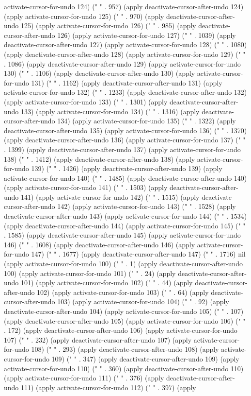 activate-cursor-for-undo 124) (" " . 957) (apply deactivate-cursor-after-undo 124) (apply activate-cursor-for-undo 125) (" " . 970) (apply deactivate-cursor-after-undo 125) (apply activate-cursor-for-undo 126) (" " . 985) (apply deactivate-cursor-after-undo 126) (apply activate-cursor-for-undo 127) (" " . 1039) (apply deactivate-cursor-after-undo 127) (apply activate-cursor-for-undo 128) (" " . 1080) (apply deactivate-cursor-after-undo 128) (apply activate-cursor-for-undo 129) (" " . 1086) (apply deactivate-cursor-after-undo 129) (apply activate-cursor-for-undo 130) (" " . 1106) (apply deactivate-cursor-after-undo 130) (apply activate-cursor-for-undo 131) (" " . 1162) (apply deactivate-cursor-after-undo 131) (apply activate-cursor-for-undo 132) (" " . 1233) (apply deactivate-cursor-after-undo 132) (apply activate-cursor-for-undo 133) (" " . 1301) (apply deactivate-cursor-after-undo 133) (apply activate-cursor-for-undo 134) (" " . 1316) (apply deactivate-cursor-after-undo 134) (apply activate-cursor-for-undo 135) (" " . 1322) (apply deactivate-cursor-after-undo 135) (apply activate-cursor-for-undo 136) (" " . 1370) (apply deactivate-cursor-after-undo 136) (apply activate-cursor-for-undo 137) (" " . 1399) (apply deactivate-cursor-after-undo 137) (apply activate-cursor-for-undo 138) (" " . 1412) (apply deactivate-cursor-after-undo 138) (apply activate-cursor-for-undo 139) (" " . 1426) (apply deactivate-cursor-after-undo 139) (apply activate-cursor-for-undo 140) (" " . 1485) (apply deactivate-cursor-after-undo 140) (apply activate-cursor-for-undo 141) (" " . 1503) (apply deactivate-cursor-after-undo 141) (apply activate-cursor-for-undo 142) (" " . 1515) (apply deactivate-cursor-after-undo 142) (apply activate-cursor-for-undo 143) (" " . 1528) (apply deactivate-cursor-after-undo 143) (apply activate-cursor-for-undo 144) (" " . 1534) (apply deactivate-cursor-after-undo 144) (apply activate-cursor-for-undo 145) (" " . 1585) (apply deactivate-cursor-after-undo 145) (apply activate-cursor-for-undo 146) (" " . 1608) (apply deactivate-cursor-after-undo 146) (apply activate-cursor-for-undo 147) (" " . 1677) (apply deactivate-cursor-after-undo 147) (" " . 1716) nil (apply activate-cursor-for-undo 100) (" " . 1) (apply deactivate-cursor-after-undo 100) (apply activate-cursor-for-undo 101) (" " . 24) (apply deactivate-cursor-after-undo 101) (apply activate-cursor-for-undo 102) (" " . 44) (apply deactivate-cursor-after-undo 102) (apply activate-cursor-for-undo 103) (" " . 64) (apply deactivate-cursor-after-undo 103) (apply activate-cursor-for-undo 104) (" " . 92) (apply deactivate-cursor-after-undo 104) (apply activate-cursor-for-undo 105) (" " . 107) (apply deactivate-cursor-after-undo 105) (apply activate-cursor-for-undo 106) (" " . 172) (apply deactivate-cursor-after-undo 106) (apply activate-cursor-for-undo 107) (" " . 232) (apply deactivate-cursor-after-undo 107) (apply activate-cursor-for-undo 108) (" " . 293) (apply deactivate-cursor-after-undo 108) (apply activate-cursor-for-undo 109) (" " . 347) (apply deactivate-cursor-after-undo 109) (apply activate-cursor-for-undo 110) (" " . 360) (apply deactivate-cursor-after-undo 110) (apply activate-cursor-for-undo 111) (" " . 376) (apply deactivate-cursor-after-undo 111) (apply activate-cursor-for-undo 112) (" " . 397) (apply 